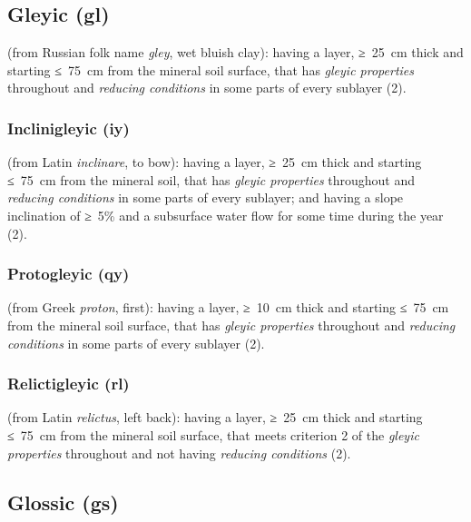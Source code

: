 \documentclass[
  letterpaper,
  DIV=11,
  numbers=noendperiod]{scrreprt}
\begin{document}
\hypertarget{gleyic-gl}{%
\subsection{Gleyic (gl)}\label{gleyic-gl}}

(from Russian folk name \emph{gley}, wet bluish clay): having a layer,
≥~25~cm thick and starting ≤~75~cm from the mineral soil surface, that
has \emph{gleyic properties} throughout and \emph{reducing conditions}
in some parts of every sublayer (2).

\hypertarget{inclinigleyic-iy}{%
\subsubsection{Inclinigleyic (iy)}\label{inclinigleyic-iy}}

(from Latin \emph{inclinare}, to bow): having a layer, ≥~25~cm thick and
starting ≤~75~cm from the mineral soil, that has \emph{gleyic
properties} throughout and \emph{reducing conditions} in some parts of
every sublayer; and having a slope inclination of ≥~5\% and a subsurface
water flow for some time during the year (2).

\hypertarget{protogleyic-qy}{%
\subsubsection{Protogleyic (qy)}\label{protogleyic-qy}}

(from Greek \emph{proton}, first): having a layer, ≥~10~cm thick and
starting ≤~75~cm from the mineral soil surface, that has \emph{gleyic
properties} throughout and \emph{reducing conditions} in some parts of
every sublayer (2).

\hypertarget{relictigleyic-rl}{%
\subsubsection{Relictigleyic (rl)}\label{relictigleyic-rl}}

(from Latin \emph{relictus}, left back): having a layer, ≥~25~cm thick
and starting ≤~75~cm from the mineral soil surface, that meets criterion
2 of the \emph{gleyic properties} throughout and not having
\emph{reducing conditions} (2).

\hypertarget{glossic-gs}{%
\subsection{Glossic (gs)}\label{glossic-gs}}
\end{document}
